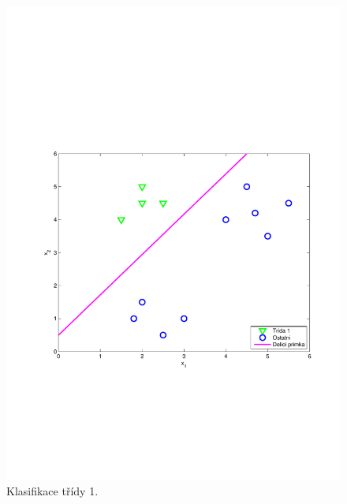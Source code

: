 \begin{figure}[!ht]
\begin{minipage}[b]{0.48\textwidth}
		\includegraphics[width = \textwidth, trim = 2.5cm 7cm 2cm 9cm]{./Img/BinarniRegrese/oneVSallClassification/oneVSall_1.pdf}
  		\caption{Klasifikace třídy 1.}
		\label{fig:oneVSall_1}
	\end{minipage}%
\end{figure}
